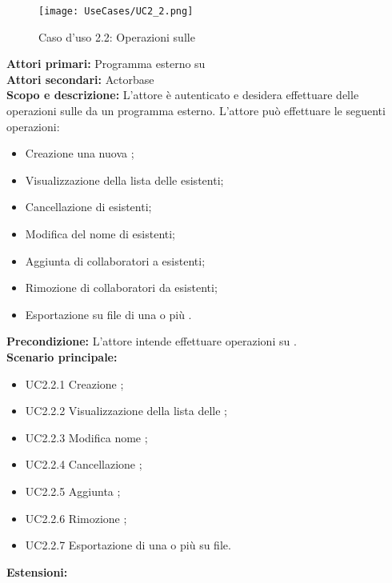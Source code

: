 \documentclass{scalatekids-article}
\begin{document}
\begin{figure}[H]
  \begin{center}
    \texttt{[image: UseCases/UC2\_2.png]}
    \caption{Caso d'uso 2.2: Operazioni sulle }
  \end{center}
\end{figure}
\textbf{Attori primari:} Programma esterno su \\
\textbf{Attori secondari:} Actorbase\\
\textbf{Scopo e descrizione:} L'attore è autenticato e desidera effettuare delle operazioni sulle  da un programma  esterno. L'attore può effettuare le seguenti operazioni:
\begin{itemize}
\item Creazione una nuova ;
\item Visualizzazione della lista delle  esistenti;
\item Cancellazione di  esistenti;
\item Modifica del nome di  esistenti;
\item Aggiunta di collaboratori a  esistenti;
\item Rimozione di collaboratori da  esistenti;
\item Esportazione su file di una o più .
\end{itemize}
\textbf{Precondizione:} L'attore intende effettuare operazioni su .\\
\textbf{Scenario principale:}
\begin{itemize}
\item UC2.2.1 Creazione ;
\item UC2.2.2 Visualizzazione della lista delle ;
\item UC2.2.3 Modifica nome ;
\item UC2.2.4 Cancellazione ;
\item UC2.2.5 Aggiunta ;
\item UC2.2.6 Rimozione ;
\item UC2.2.7 Esportazione di una o più  su file.
\end{itemize}
\textbf{Estensioni:}
\end{document}
